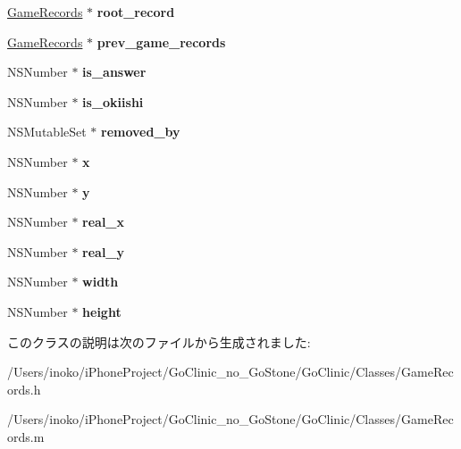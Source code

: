 \begin{DoxyCompactItemize}
\item 
\hypertarget{interface_game_records_adc4b5f3b05e165444d6fe0f8990a2a20}{
\hyperlink{interface_game_records}{GameRecords} $\ast$ {\bfseries root\_\-record}}
\label{interface_game_records_adc4b5f3b05e165444d6fe0f8990a2a20}

\item 
\hypertarget{interface_game_records_adc059fcab08c2098368b7ed9899fc3ba}{
\hyperlink{interface_game_records}{GameRecords} $\ast$ {\bfseries prev\_\-game\_\-records}}
\label{interface_game_records_adc059fcab08c2098368b7ed9899fc3ba}

\item 
\hypertarget{interface_game_records_af6b124bd715d3a78d93421a5a6a279a3}{
NSNumber $\ast$ {\bfseries is\_\-answer}}
\label{interface_game_records_af6b124bd715d3a78d93421a5a6a279a3}

\item 
\hypertarget{interface_game_records_a411adb0aa72ba8164b4818b7330a3584}{
NSNumber $\ast$ {\bfseries is\_\-okiishi}}
\label{interface_game_records_a411adb0aa72ba8164b4818b7330a3584}

\item 
\hypertarget{interface_game_records_aaa51d10929ed1036b17733a784829225}{
NSMutableSet $\ast$ {\bfseries removed\_\-by}}
\label{interface_game_records_aaa51d10929ed1036b17733a784829225}

\item 
\hypertarget{interface_game_records_aa02e21f2edd9f68f7e04cd2977cb95bc}{
NSNumber $\ast$ {\bfseries x}}
\label{interface_game_records_aa02e21f2edd9f68f7e04cd2977cb95bc}

\item 
\hypertarget{interface_game_records_a45fd4561f02e032dad6e80d864b7bfc1}{
NSNumber $\ast$ {\bfseries y}}
\label{interface_game_records_a45fd4561f02e032dad6e80d864b7bfc1}

\item 
\hypertarget{interface_game_records_ae659b5bdfd2c5662ed4edbc43593eb90}{
NSNumber $\ast$ {\bfseries real\_\-x}}
\label{interface_game_records_ae659b5bdfd2c5662ed4edbc43593eb90}

\item 
\hypertarget{interface_game_records_acfe802f54e8a19c2069c5e84c0eae38c}{
NSNumber $\ast$ {\bfseries real\_\-y}}
\label{interface_game_records_acfe802f54e8a19c2069c5e84c0eae38c}

\item 
\hypertarget{interface_game_records_af8f2b44d291b5d53214e9f35fe91ce77}{
NSNumber $\ast$ {\bfseries width}}
\label{interface_game_records_af8f2b44d291b5d53214e9f35fe91ce77}

\item 
\hypertarget{interface_game_records_a4fc7d57ec48774fb91242c2f00010946}{
NSNumber $\ast$ {\bfseries height}}
\label{interface_game_records_a4fc7d57ec48774fb91242c2f00010946}

\end{DoxyCompactItemize}


このクラスの説明は次のファイルから生成されました:\begin{DoxyCompactItemize}
\item 
/Users/inoko/iPhoneProject/GoClinic\_\-no\_\-GoStone/GoClinic/Classes/GameRecords.h\item 
/Users/inoko/iPhoneProject/GoClinic\_\-no\_\-GoStone/GoClinic/Classes/GameRecords.m\end{DoxyCompactItemize}
